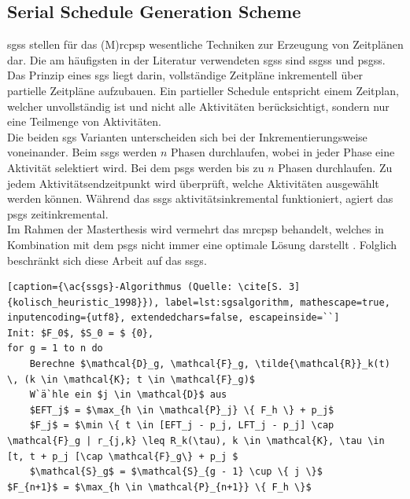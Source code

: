 \subsection{Serial Schedule Generation Scheme} \label{subsec:SGS}

\acp{sgs} stellen für das (M)\ac{rcpsp} wesentliche Techniken zur Erzeugung von Zeitplänen dar. Die am häufigsten in der Literatur verwendeten \acp{sgs} sind \acfp{ssgs} und \acfp{psgs}. Das Prinzip eines \ac{sgs} liegt darin,  vollständige Zeitpläne inkrementell über partielle Zeitpläne aufzubauen. Ein partieller Schedule entspricht einem Zeitplan, welcher unvollständig ist und nicht alle Aktivitäten berücksichtigt, sondern nur eine Teilmenge von Aktivitäten. \cite[vgl.][S. 3 f.]{kolisch_heuristic_1998}\\

Die beiden \ac{sgs} Varianten unterscheiden sich bei der Inkrementierungsweise voneinander. Beim \ac{ssgs} werden $n$ Phasen durchlaufen, wobei in jeder Phase eine Aktivität selektiert wird. Bei dem \ac{psgs} werden bis zu $n$ Phasen durchlaufen. Zu jedem Aktivitätsendzeitpunkt wird überprüft, welche Aktivitäten ausgewählt werden können. Während das \ac{ssgs} aktivitätsinkremental funktioniert, agiert das \ac{psgs} zeitinkremental. \cite[vgl.][S. 3 f.]{kolisch_heuristic_1998}\\

Im Rahmen der Masterthesis wird vermehrt das \ac{mrcpsp} behandelt, welches in Kombination mit dem \acf{psgs} nicht immer eine optimale Lösung darstellt \cite[vgl.][S. 911 f.]{alcaraz_solving_2003} \cite[vgl.][S. 5 f.]{kolisch_heuristic_1998} . Folglich beschränkt sich diese Arbeit auf das \ac{ssgs}. 

\begin{lstlisting}[caption={\ac{ssgs}-Algorithmus (Quelle: \cite[S. 3]{kolisch_heuristic_1998}}), label=lst:sgsalgorithm, mathescape=true, inputencoding={utf8}, extendedchars=false, escapeinside=``]
Init: $F_0$, $S_0 = $ {0},
for g = 1 to n do
    Berechne $\mathcal{D}_g, \mathcal{F}_g, \tilde{\mathcal{R}}_k(t) \, (k \in \mathcal{K}; t \in \mathcal{F}_g)$ 
    W`ä`hle ein $j \in \mathcal{D}$ aus
    $EFT_j$ = $\max_{h \in \mathcal{P}_j} \{ F_h \} + p_j$
    $F_j$ = $\min \{ t \in [EFT_j - p_j, LFT_j - p_j] \cap \mathcal{F}_g | r_{j,k} \leq R_k(\tau), k \in \mathcal{K}, \tau \in [t, t + p_j [\cap \mathcal{F}_g\} + p_j $
    $\mathcal{S}_g$ = $\mathcal{S}_{g - 1} \cup \{ j \}$
$F_{n+1}$ = $\max_{h \in \mathcal{P}_{n+1}} \{ F_h \}$  
\end{lstlisting}


